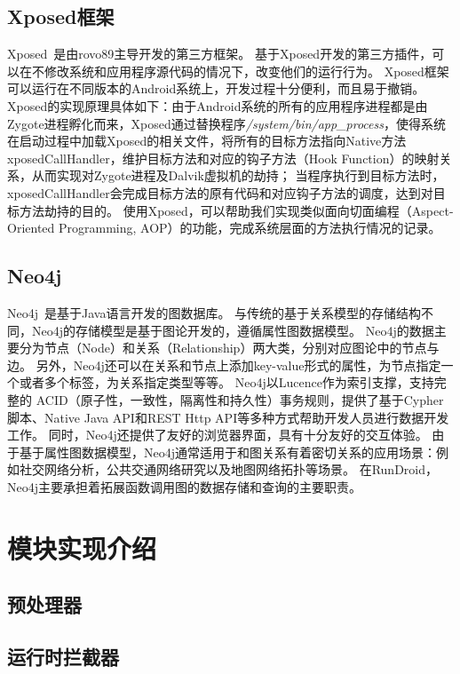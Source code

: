 \subsection{Xposed框架}
Xposed~\cite{Xposed}是由rovo89主导开发的第三方框架。
基于Xposed开发的第三方插件，可以在不修改系统和应用程序源代码的情况下，改变他们的运行行为。
Xposed框架可以运行在不同版本的Android系统上，开发过程十分便利，而且易于撤销。
Xposed的实现原理具体如下：由于Android系统的所有的应用程序进程都是由Zygote进程孵化而来，Xposed通过替换程序\textit{/system/bin/app\_process}，使得系统在启动过程中加载Xposed的相关文件，将所有的目标方法指向Native方法xposedCallHandler，维护目标方法和对应的钩子方法（Hook Function）的映射关系，从而实现对Zygote进程及Dalvik虚拟机的劫持；
当程序执行到目标方法时，xposedCallHandler会完成目标方法的原有代码和对应钩子方法的调度，达到对目标方法劫持的目的。
使用Xposed，可以帮助我们实现类似面向切面编程（Aspect-Oriented Programming, AOP）的功能，完成系统层面的方法执行情况的记录。
\subsection{Neo4j}
Neo4j~\cite{Neo4jthe19}是基于Java语言开发的图数据库。
与传统的基于关系模型的存储结构不同，Neo4j的存储模型是基于图论开发的，遵循属性图数据模型。
Neo4j的数据主要分为节点（Node）和关系（Relationship）两大类，分别对应图论中的节点与边。
另外，Neo4j还可以在关系和节点上添加key-value形式的属性，为节点指定一个或者多个标签，为关系指定类型等等。
Neo4j以Lucence作为索引支撑，支持完整的 ACID（原子性，一致性，隔离性和持久性）事务规则，提供了基于Cypher脚本、Native Java API和REST Http API等多种方式帮助开发人员进行数据开发工作。
同时，Neo4j还提供了友好的浏览器界面，具有十分友好的交互体验。
由于基于属性图数据模型，Neo4j通常适用于和图关系有着密切关系的应用场景：例如社交网络分析，公共交通网络研究以及地图网络拓扑等场景。
在RunDroid，Neo4j主要承担着拓展函数调用图的数据存储和查询的主要职责。

\section{模块实现介绍}


\subsection{预处理器}


\subsection{运行时拦截器}

